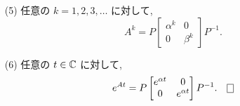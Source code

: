 \documentclass[12pt,twoside]{jarticle}
\begin{document}
\begin{question}[10点]
\begin{enumerate}
\begin{equation*}
    \end{equation*}
  \item[(5)] 任意の $k=1,2,3,\ldots$ に対して,
    \begin{equation*}
      A^k = P \begin{bmatrix}\alpha^k & 0\\0 & \beta^k\end{bmatrix} P^{-1}.
    \end{equation*}
  \item[(6)] 任意の $t\in{\mathbb C}$ に対して,
    \begin{equation*}
      e^{At} =
      P
      \begin{bmatrix}
        e^{\alpha t} & 0 \\
        0 & e^{\alpha t} \\
      \end{bmatrix}
      P^{-1}.
    \qed
    \end{equation*}
  \end{enumerate}
\end{question}

\end{document}
